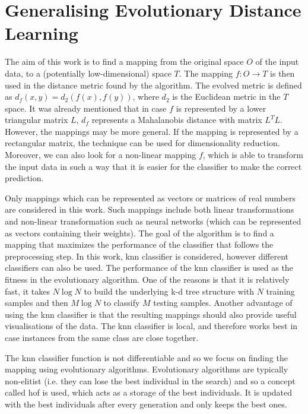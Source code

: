 \documentclass[12pt,a4paper]{report}
\begin{document}

\chapter{Generalising Evolutionary Distance Learning} \label{chap:our-method}

The aim of this work is to find a mapping from the original space $O$ of the input data, to a (potentially low-dimensional) space $T$. The mapping $f: O \to T$ is then used in the distance metric found by the algorithm. The evolved metric is defined as $d_f(x, y) = d_2(f(x), f(y))$, where $d_2$ is the Euclidean metric in the $T$ space. It was already mentioned that in case $f$ is represented by a lower triangular matrix $L$, $d_f$ represents a Mahalanobis distance with matrix $L^TL$. However, the mappings may be more general. If the mapping is represented by a rectangular matrix, the technique can be used for dimensionality reduction. Moreover, we can also look for a non-linear mapping $f$, which is able to transform the input data in such a way that it is easier for the classifier to make the correct prediction.

Only mappings which can be represented as vectors or matrices of real numbers are considered in this work. Such mappings include both linear transformations and non-linear transformation such as neural networks (which can be represented as vectors containing their weights). The goal of the algorithm is to find a mapping that maximizes the performance of the classifier that follows the preprocessing step. In this work, \ac{knn} classifier is considered, however different classifiers can also be used. The performance of the \ac{knn} classifier is used as the fitness in the evolutionary algorithm. One of the reasons is that it is relatively fast, it takes $N\log{N}$ to build the underlying k-d tree structure with $N$ training samples and then $M \log{N}$ to classify $M$ testing samples. Another advantage of using the \ac{knn} classifier is that the resulting mappings should also provide useful visualisations of the data. The \ac{knn} classifier is local, and therefore works best in case instances from the same class are close together.

The \ac{knn} classifier function is not differentiable and so we focus on finding the mapping using evolutionary algorithms. Evolutionary algorithms are typically non-elitist (i.e. they can lose the best individual in the search) and so a concept called \ac{hof} is used, which acts as a storage of the best individuals. It is updated with the best individuals after every generation and only keeps the best ones.
\end{document}
